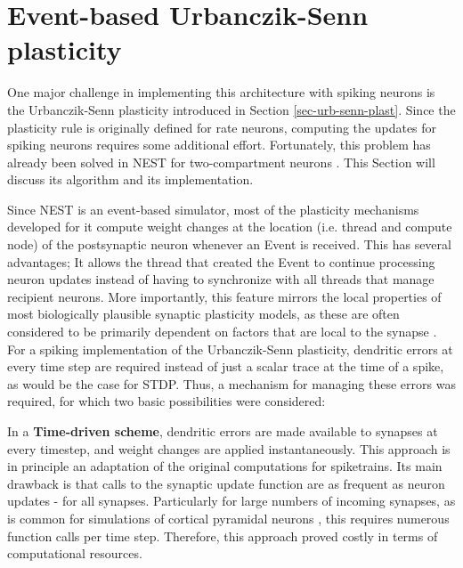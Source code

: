 \section{Event-based Urbanczik-Senn plasticity}\label{sec-event-urb}

One major challenge in implementing this architecture with spiking neurons is the Urbanczik-Senn plasticity introduced
in Section \ref{sec-urb-senn-plast}. Since the plasticity rule is originally defined for rate neurons, computing the
updates for spiking neurons requires some additional effort. Fortunately, this problem has already been solved in NEST
for two-compartment neurons \citep{Stapmanns2021}. This Section will discuss its algorithm and its implementation.
\newline

Since NEST is an event-based simulator, most of the plasticity mechanisms developed for it compute weight changes at the
location (i.e. thread and compute node) of the postsynaptic neuron whenever an Event is received. This has several
advantages; It allows the thread that created the Event to continue processing neuron updates instead of having to
synchronize with all threads that manage recipient neurons.  More importantly, this feature mirrors the local properties
of most biologically plausible synaptic plasticity models, as these are often considered to be primarily dependent on
factors that are local to the synapse \citep{magee2020synaptic}. For a spiking implementation of the Urbanczik-Senn
plasticity, dendritic errors at every time step are required instead of just a scalar trace at the time of a spike, as
would be the case for STDP. Thus, a mechanism for managing these errors was required, for which two basic possibilities
were considered:

In a \textbf{Time-driven scheme}, dendritic errors are made available to synapses at every timestep, and weight changes
are applied instantaneously. This approach is in principle an adaptation of the original computations for spiketrains.
Its main drawback is that calls to the synaptic update function are as frequent as neuron updates - for all synapses.
Particularly for large numbers of incoming synapses, as is common for simulations of cortical pyramidal neurons
\citep{potjans2014cell,vezoli2004quantitative}, this requires numerous function calls per time step.  Therefore, this
approach proved costly in terms of computational resources.

